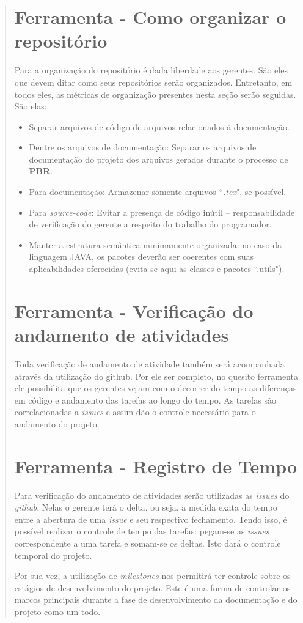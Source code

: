 \documentclass[12pt,a4paper,final]{report}
\begin{document}
\begin{quotation}
	\section*{Ferramenta - Como organizar o repositório}
	\quad Para a organização do repositório é dada liberdade aos gerentes. São eles que devem ditar como seus repositórios serão organizados. Entretanto, em todos eles, as métricas de organização presentes nesta seção serão seguidas. São elas:
	\begin{itemize}
		\item Separar arquivos de código de arquivos relacionados à documentação.
		\item Dentre os arquivos de documentação: Separar os arquivos de documentação do projeto dos arquivos gerados durante o processo de \textbf{PBR}.
		\item Para documentação: Armazenar somente arquivos ``\textit{.tex}", se possível. 
		\item Para \textit{source-code}: Evitar a presença de código inútil -- responsabilidade de verificação do gerente a respeito do trabalho do programador.
		\item Manter a estrutura semântica minimamente organizada: no caso da linguagem JAVA, os pacotes deverão ser coerentes com suas aplicabilidades oferecidas (evita-se aqui as classes e pacotes ``.utils").
	\end{itemize}
	\section*{Ferramenta - Verificação do andamento de atividades}
	\quad Toda verificação de andamento de atividade também será acompanhada através da utilização do github. Por ele ser completo, no quesito ferramenta ele possibilita que os gerentes vejam com o decorrer do tempo as diferenças em código e andamento das tarefas ao longo do tempo. As tarefas são correlacionadas a \textit{issues} e assim dão o controle necessário para o andamento do projeto.
	\section*{Ferramenta - Registro de Tempo}
	\quad Para verificação do andamento de atividades serão utilizadas as \textit{issues} do \textit{github}. Nelas o gerente terá o delta, ou seja, a medida exata do tempo entre a abertura de uma \textit{issue} e seu respectivo fechamento. Tendo isso, é possível realizar o controle de tempo das tarefas: pegam-se as \textit{issues} correspondente a uma tarefa e somam-se os deltas. Isto dará o controle temporal do projeto. 
	
	\quad Por sua vez, a utilização de \textit{milestones} nos permitirá ter controle sobre os estágios de desenvolvimento do projeto. Este é uma forma de controlar os marcos principais durante a fase de desenvolvimento da documentação e do projeto como um todo.
	\end{quotation}
	
	
\end{document}
